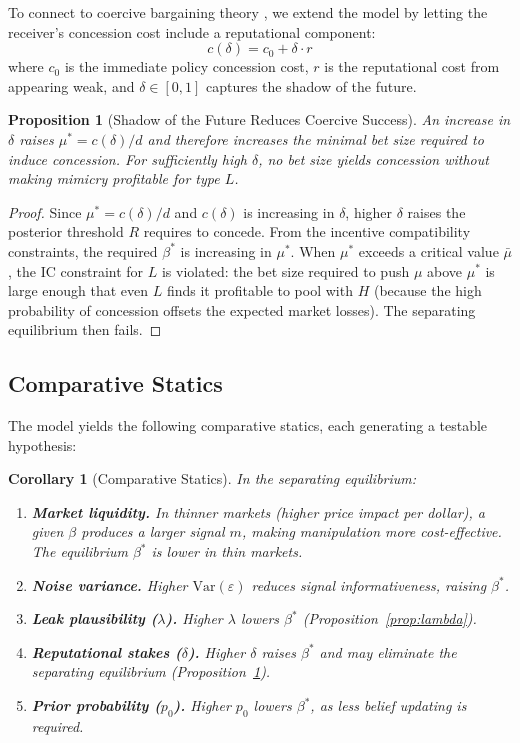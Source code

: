 \documentclass[12pt]{article}
\newtheorem{proposition}{Proposition}
\newtheorem{corollary}{Corollary}
\begin{document}
To connect to coercive bargaining theory \citep{sechser2018}, we extend the model by letting the receiver's concession cost include a reputational component:
\begin{equation}
c(\delta) = c_0 + \delta \cdot r
\end{equation}
where $c_0$ is the immediate policy concession cost, $r$ is the reputational cost from appearing weak, and $\delta \in [0,1]$ captures the shadow of the future.

\begin{proposition}[Shadow of the Future Reduces Coercive Success]\label{prop:shadow}
An increase in $\delta$ raises $\mu^* = c(\delta)/d$ and therefore increases the minimal bet size required to induce concession. For sufficiently high $\delta$, no bet size yields concession without making mimicry profitable for type $L$.
\end{proposition}

\begin{proof}
Since $\mu^* = c(\delta)/d$ and $c(\delta)$ is increasing in $\delta$, higher $\delta$ raises the posterior threshold $R$ requires to concede. From the incentive compatibility constraints, the required $\beta^*$ is increasing in $\mu^*$. When $\mu^*$ exceeds a critical value $\bar{\mu}$, the IC constraint for $L$ is violated: the bet size required to push $\mu$ above $\mu^*$ is large enough that even $L$ finds it profitable to pool with $H$ (because the high probability of concession offsets the expected market losses). The separating equilibrium then fails.
\end{proof}

\subsection{Comparative Statics}

The model yields the following comparative statics, each generating a testable hypothesis:

\begin{corollary}[Comparative Statics]\label{cor:compstats}
In the separating equilibrium:
\begin{enumerate}[label=(\roman*)]
    \item \textbf{Market liquidity.} In thinner markets (higher price impact per dollar), a given $\beta$ produces a larger signal $m$, making manipulation more cost-effective. The equilibrium $\beta^*$ is lower in thin markets.
    \item \textbf{Noise variance.} Higher $\text{Var}(\varepsilon)$ reduces signal informativeness, raising $\beta^*$.
    \item \textbf{Leak plausibility ($\lambda$).} Higher $\lambda$ lowers $\beta^*$ (Proposition~\ref{prop:lambda}).
    \item \textbf{Reputational stakes ($\delta$).} Higher $\delta$ raises $\beta^*$ and may eliminate the separating equilibrium (Proposition~\ref{prop:shadow}).
    \item \textbf{Prior probability ($p_0$).} Higher $p_0$ lowers $\beta^*$, as less belief updating is required.
\end{enumerate}
\end{corollary}
\end{document}
